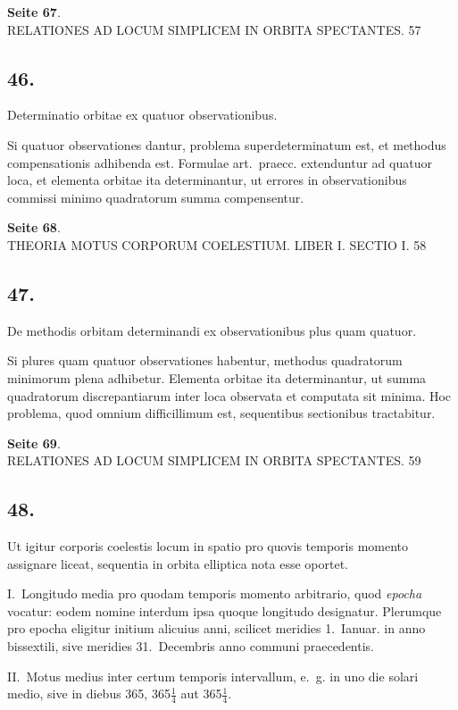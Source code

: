\documentclass[12pt,a4paper]{article}
\begin{document}
\textbf{Seite 67}.\\
RELATIONES AD LOCUM SIMPLICEM IN ORBITA SPECTANTES. 57

\subsection*{46.}

Determinatio orbitae ex quatuor observationibus.

Si quatuor observationes dantur, problema superdeterminatum est, et methodus compensationis adhibenda est. Formulae art.~praecc. extenduntur ad quatuor loca, et elementa orbitae ita determinantur, ut errores in observationibus commissi minimo quadratorum summa compensentur.

\textbf{Seite 68}.\\
THEORIA MOTUS CORPORUM COELESTIUM. LIBER I. SECTIO I. 58

\subsection*{47.}

De methodis orbitam determinandi ex observationibus plus quam quatuor.

Si plures quam quatuor observationes habentur, methodus quadratorum minimorum plena adhibetur. Elementa orbitae ita determinantur, ut summa quadratorum discrepantiarum inter loca observata et computata sit minima. Hoc problema, quod omnium difficillimum est, sequentibus sectionibus tractabitur.

\textbf{Seite 69}.\\
RELATIONES AD LOCUM SIMPLICEM IN ORBITA SPECTANTES. 59

\subsection*{48.}

Ut igitur corporis coelestis locum in spatio pro quovis temporis momento assignare liceat, sequentia in orbita elliptica nota esse oportet.

I.~Longitudo media pro quodam temporis momento arbitrario, quod \emph{epocha} vocatur: eodem nomine interdum ipsa quoque longitudo designatur. Plerumque pro epocha eligitur initium alicuius anni, scilicet meridies 1.~Ianuar. in anno bissextili, sive meridies 31.~Decembris anno communi praecedentis.

II.~Motus medius inter certum temporis intervallum, e.~g. in uno die solari medio, sive in diebus 365, 365$\frac{1}{4}$ aut 365$\frac{1}{4}$.
\end{document}
